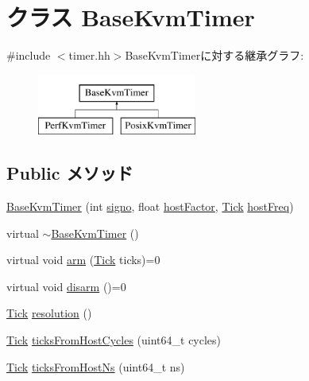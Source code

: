 \hypertarget{classBaseKvmTimer}{
\section{クラス BaseKvmTimer}
\label{classBaseKvmTimer}
}


{\ttfamily \#include $<$timer.hh$>$}BaseKvmTimerに対する継承グラフ:\begin{figure}[H]
\begin{center}
\leavevmode
\includegraphics[height=2cm]{classBaseKvmTimer}
\end{center}
\end{figure}
\subsection*{Public メソッド}
\begin{DoxyCompactItemize}
\item 
\hyperlink{classBaseKvmTimer_a0593c66dc86ef9aeff3553a78e114231}{BaseKvmTimer} (int \hyperlink{classBaseKvmTimer_a68acd751895efa9ac5a6461017f1d2d8}{signo}, float \hyperlink{classBaseKvmTimer_a0ef366aa4bbbcdc2f7eeb7fcd3962dde}{hostFactor}, \hyperlink{base_2types_8hh_a5c8ed81b7d238c9083e1037ba6d61643}{Tick} \hyperlink{classBaseKvmTimer_af880b55be2bf83ac65eb9b0abe62ae49}{hostFreq})
\item 
virtual \hyperlink{classBaseKvmTimer_afbfb3a067be95a63da916f38d0beac51}{$\sim$BaseKvmTimer} ()
\item 
virtual void \hyperlink{classBaseKvmTimer_af6a92c8cd2abd0bf8699cbefe1257074}{arm} (\hyperlink{base_2types_8hh_a5c8ed81b7d238c9083e1037ba6d61643}{Tick} ticks)=0
\item 
virtual void \hyperlink{classBaseKvmTimer_aaef5c4bcad609bff2d6580c368020346}{disarm} ()=0
\item 
\hyperlink{base_2types_8hh_a5c8ed81b7d238c9083e1037ba6d61643}{Tick} \hyperlink{classBaseKvmTimer_a4450cc644b16fe4cb8b25ed02fb6446f}{resolution} ()
\item 
\hyperlink{base_2types_8hh_a5c8ed81b7d238c9083e1037ba6d61643}{Tick} \hyperlink{classBaseKvmTimer_ace36954bea0efa9977b9d4760437860b}{ticksFromHostCycles} (uint64\_\-t cycles)
\item 
\hyperlink{base_2types_8hh_a5c8ed81b7d238c9083e1037ba6d61643}{Tick} \hyperlink{classBaseKvmTimer_a4702535d08d1d648d5a5bcd113edc395}{ticksFromHostNs} (uint64\_\-t ns)
\end{DoxyCompactItemize}
